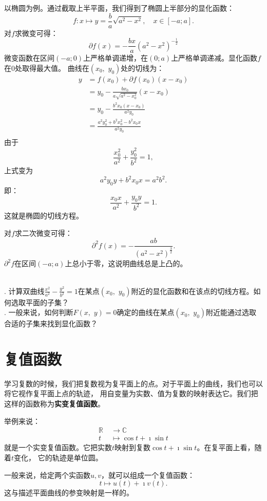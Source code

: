 \documentclass[12pt,UTF8,fontset=none]{ctexbook}
\begin{document}
以椭圆为例。通过截取上半平面，我们得到了椭圆上半部分的显化函数：
$$ f: x\mapsto y = \frac{b}{a}\sqrt{a^2 - x^2}, \quad x \in [-a; a].  $$
对$f$求微变可得：
$$ \partial f(x) = -\frac{bx}{a}(a^2 - x^2)^{-\frac{1}{2}}$$
微变函数在区间$(-a;0)$上严格单调递增，在$(0;a)$上严格单调递减。显化函数$f$在$0$处取得最大值。
曲线在$(x_0,\,\, y_0)$处的切线为：
\begin{align*}
    y &= f(x_0) + \partial f(x_0)(x - x_0) \\
    &= y_0 -\frac{bx_0}{a\sqrt{a^2 - x_0^2}}(x - x_0) \\
    &= y_0 - \frac{b^2x_0(x - x_0)}{a^2y_0} \\
    &= \frac{a^2y_0^2 + b^2x_0^2 - b^2x_0x}{a^2y_0} \\
\end{align*}
由于
$$ \frac{x_0^2}{a^2} + \frac{y_0^2}{b^2} = 1,$$
上式变为
$$ a^2y_0y +  b^2x_0x = a^2b^2. $$
即：
$$ \frac{x_0x}{a^2} + \frac{y_0y}{b^2} = 1.$$
这就是椭圆的切线方程。

对$f$求二次微变可得：
$$ \partial^2 f(x) = -\frac{ab}{(a^2 - x^2)^{\frac{3}{2}} }.$$
$\partial^2 f$在区间$(-a;a)$上总小于零，这说明曲线总是上凸的。

\begin{sk}
    \mbox{} \\
    . 计算双曲线$\frac{x^2}{a^2} - \frac{y^2}{b^2} = 1$在某点$(x_0,\,\,y_0)$附近的显化函数和在该点的切线方程。如何选取平面的子集？\\
    . 一般来说，如何判断$F(x,\,\, y) = 0$确定的曲线在某点$(x_0,\,\,y_0)$附近能通过选取合适的子集来找到显化函数？
\end{sk}

\section{复值函数}

学习复数的时候，我们把复数视为复平面上的点。对于平面上的曲线，我们也可以将它视作复平面上点的轨迹，
用自变量为实数、值为复数的映射表达它。我们把这样的函数称为\textbf{实变复值函数}。

举例来说：
\begin{align*}
    \mathbb{R} \;&\rightarrow \mathbb{C} \\
    t \;&\mapsto \cos{t} + \imath \sin{t}
\end{align*}
就是一个实变复值函数。它把实数$t$映射到复数$\cos{t} + \imath \sin{t}$。在复平面上看，随着$t$变化，
它的轨迹是单位圆。

一般来说，给定两个实函数$u,v$，就可以组成一个复值函数：
$$ t\mapsto u(t) + \imath v(t).$$
这与描述平面曲线的参变映射是一样的。
\end{document}
